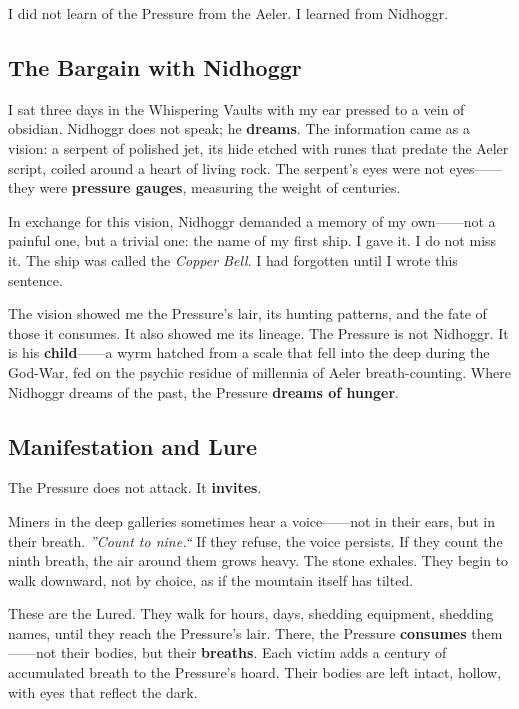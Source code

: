 I did not learn of the Pressure from the Aeler. I learned from Nidhoggr.

\subsection{The Bargain with Nidhoggr}

I sat three days in the Whispering Vaults with my ear pressed to a vein of obsidian. Nidhoggr does not speak; he \textbf{dreams}. The information came as a vision: a serpent of polished jet, its hide etched with runes that predate the Aeler script, coiled around a heart of living rock. The serpent's eyes were not eyes------they were \textbf{pressure gauges}, measuring the weight of centuries.

In exchange for this vision, Nidhoggr demanded a memory of my own------not a painful one, but a trivial one: the name of my first ship. I gave it. I do not miss it. The ship was called the \textit{Copper Bell}. I had forgotten until I wrote this sentence.

The vision showed me the Pressure's lair, its hunting patterns, and the fate of those it consumes. It also showed me its lineage. The Pressure is not Nidhoggr. It is his \textbf{child}------a wyrm hatched from a scale that fell into the deep during the God-War, fed on the psychic residue of millennia of Aeler breath-counting. Where Nidhoggr dreams of the past, the Pressure \textbf{dreams of hunger}.

\subsection{Manifestation and Lure}

The Pressure does not attack. It \textbf{invites}.

Miners in the deep galleries sometimes hear a voice------not in their ears, but in their breath. \emph{''Count to nine.``} If they refuse, the voice persists. If they count the ninth breath, the air around them grows heavy. The stone exhales. They begin to walk downward, not by choice, as if the mountain itself has tilted.

These are the Lured. They walk for hours, days, shedding equipment, shedding names, until they reach the Pressure's lair. There, the Pressure \textbf{consumes} them------not their bodies, but their \textbf{breaths}. Each victim adds a century of accumulated breath to the Pressure's hoard. Their bodies are left intact, hollow, with eyes that reflect the dark.

